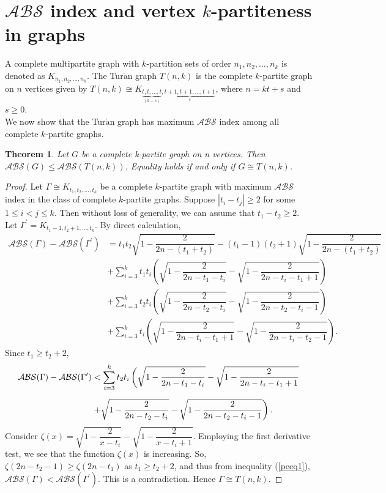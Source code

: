 \documentclass[12pt]{article}
\newtheorem{theorem}{Theorem}[section]
\begin{document}
 \section{$\mathcal{ABS}$ index and vertex $k$-partiteness in graphs}\label{given2}
 A complete multipartite graph with $k$-partition sets of order $n_{1}, n_{2},\ldots, n_{k}$ is denoted as $K_{n_1,n_2,\ldots,n_k}$. 
 The Tur$\acute{\text{a}}$n graph $T(n,k)$ is the complete $k$-partite graph on $n$ vertices given by $T(n,k)\cong K_{\underbrace{t,t,\dots,t}_{(k-s) }, \underbrace{t+1,t+1,\dots,t+1}_{s}}$, where $n=kt+s$ and $s\ge 0$.\\
We now show that the Tur$\acute{\text{a}}$n graph has maximum $\mathcal{ABS}$ index among all complete $k$-partite graphs.
 \begin{theorem}\label{turan}
 Let $G$ be a complete k-partite graph on n vertices. Then $\mathcal{ABS}(G)\le \mathcal{ABS}(T(n,k))$. Equality holds if and only if $G\cong T(n,k)$.
 \end{theorem}
 \begin{proof}
 Let $\Gamma\cong K_{t_1,t_2,\dots,t_k}$ be a complete $k$-partite graph with maximum $\mathcal{ABS}$ index in the class of complete $k$-partite graphs. Suppose $|t_{i}-t_{j}|\ge 2$ for some $1\le i< j\le k$. Then without loss of generality, we can  assume that $t_{1}-t_{2}\ge2$. Let $\Gamma^{\prime}=K_{t_1-1,t_2+1,\dots,t_k}$. By direct calculation, 
\begin{align*}
\mathcal{ABS}(\Gamma)-\mathcal{ABS}(\Gamma^{\prime})&=
t_1t_2\sqrt{1-\dfrac{2}{2n-(t_1+t_2)}}-(t_1-1)(t_2+1)\sqrt{1-\dfrac{2}{2n-(t_1+t_2)}}\\[2mm]&+\sum\limits_{i=3}^k t_1t_i\left(\sqrt{1-\dfrac{2}{2n-t_1-t_i}}-\sqrt{1-\dfrac{2}{2n-t_i-t_1+1}}\right)\\[2mm]&+\sum\limits_{i=3}^k t_2t_i\left(\sqrt{1-\dfrac{2}{2n-t_2-t_i}}-\sqrt{1-\dfrac{2}{2n-t_2-t_i-1}}\right)\\[2mm]
&+\sum_{i=3}^{k}t_{i}\left(\sqrt{1-\dfrac{2}{2n-t_{i}-t_{1}+1}}-\sqrt{1-\dfrac{2}{2n-t_{i}-t_{2}-1}}\right).
 \end{align*}
Since $t_{1}\ge t_{2}+2$, \begin{align}\label{peeq1}\mathcal{ABS}(\Gamma)-\mathcal{ABS}(\Gamma^{\prime})&< \sum\limits_{i=3}^k t_2t_i\left(\sqrt{1-\dfrac{2}{2n-t_1-t_i}}-\sqrt{1-\dfrac{2}{2n-t_i-t_1+1}}\right.
\notag\\[2mm]&\left.+\sqrt{1-\dfrac{2}{2n-t_2-t_i}}-\sqrt{1-\dfrac{2}{2n-t_2-t_i-1}}\right).\end{align}
 Consider $\zeta(x)=\sqrt{1-\dfrac{2}{x-t_{i}}}-\sqrt{1-\dfrac{2}{x-t_{i}+1}}$. Employing the first derivative test, we see that the  function $\zeta(x)$ is increasing. So, $\zeta(2n-t_{2}-1)\ge \zeta(2n-t_{1})$ as $t_{1}\ge t_{2}+2$, and thus from inequality (\ref{peeq1}), $\mathcal{ABS}(\Gamma)<\mathcal{ABS}(\Gamma^{\prime})$.   
 This is a contradiction. Hence $\Gamma\cong T(n,k)$.
  \end{proof}
\end{document}
